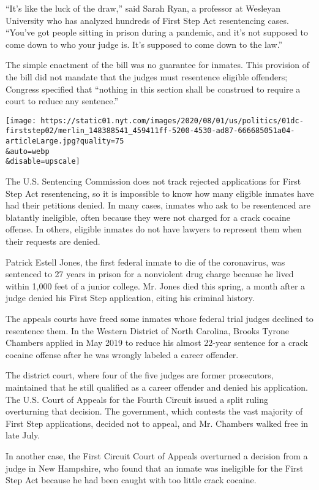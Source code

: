 ``It's like the luck of the draw,'' said Sarah Ryan, a professor at
Wesleyan University who has analyzed hundreds of First Step Act
resentencing cases. ``You've got people sitting in prison during a
pandemic, and it's not supposed to come down to who your judge is. It's
supposed to come down to the law.''

The simple enactment of the bill was no guarantee for inmates. This
provision of the bill did not mandate that the judges must resentence
eligible offenders; Congress specified that ``nothing in this section
shall be construed to require a court to reduce any sentence.''

\texttt{[image: https://static01.nyt.com/images/2020/08/01/us/politics/01dc-firststep02/merlin\_148388541\_459411ff-5200-4530-ad87-666685051a04-articleLarge.jpg?quality=75\\\&auto=webp\\\&disable=upscale]}

The U.S. Sentencing Commission does not track rejected applications for
First Step Act resentencing, so it is impossible to know how many
eligible inmates have had their petitions denied. In many cases, inmates
who ask to be resentenced are blatantly ineligible, often because they
were not charged for a crack cocaine offense. In others, eligible
inmates do not have lawyers to represent them when their requests are
denied.

Patrick Estell Jones, the first federal inmate to die of the
coronavirus, was sentenced to 27 years in prison for a nonviolent drug
charge because he lived within 1,000 feet of a junior college. Mr. Jones
died this spring, a month after a judge denied his First Step
application, citing his criminal history.

The appeals courts have freed some inmates whose federal trial judges
declined to resentence them. In the Western District of North Carolina,
Brooks Tyrone Chambers applied in May 2019 to reduce his almost 22-year
sentence for a crack cocaine offense after he was wrongly labeled a
career offender.

The district court, where four of the five judges are former
prosecutors, maintained that he still qualified as a career offender and
denied his application. The U.S. Court of Appeals for the Fourth Circuit
issued a split ruling overturning that decision. The government, which
contests the vast majority of First Step applications, decided not to
appeal, and Mr. Chambers walked free in late July.

In another case, the First Circuit Court of Appeals overturned a
decision from a judge in New Hampshire, who found that an inmate was
ineligible for the First Step Act because he had been caught with too
little crack cocaine.

